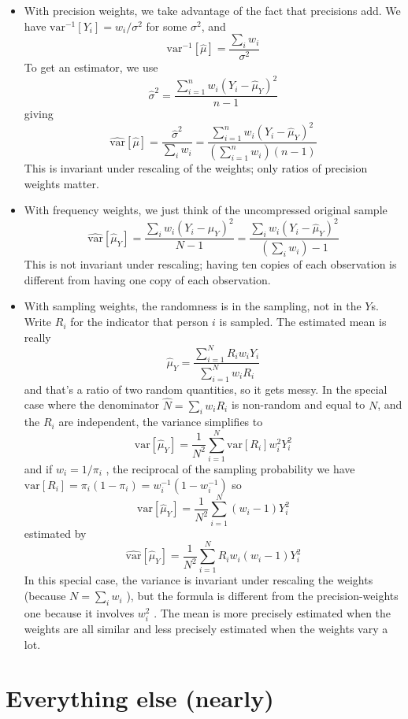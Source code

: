 \documentclass[fleqn,10pt]{latex/stylish_article} %
\providecommand{\tightlist}{%
  \setlength{\itemsep}{0pt}\setlength{\parskip}{0pt}}
\begin{document}
\begin{itemize}
\tightlist
\item
  With precision weights, we take advantage of the fact that precisions add. We have \(\mathrm{var}^{-1}[Y_i]= w_i/\sigma^2\) for some \(\sigma^2\), and
  \[
  \mathrm{var}^{-1}[\hat\mu] = \frac{\sum_i w_i}{\sigma^2}
  \]
  To get an estimator, we use
  \[
  \hat\sigma^2 =\frac{\sum_{i=1}^n w_i(Y_i-\hat\mu_Y)^2}{n-1}
  \]
  giving
  \[
  \widehat{\mathrm{var}}[\hat\mu] = \frac{\hat\sigma^2}{\sum_i w_i}= \frac{\sum_{i=1}^n w_i(Y_i-\hat\mu_Y)^2}{\left(\sum_{i=1}^n w_i\right)(n-1)}
  \]
  This is invariant under rescaling of the weights; only ratios of precision weights matter.\\
\item
  With frequency weights, we just think of the uncompressed original sample
  \[
  \widehat{\mathrm{var}}[\hat\mu_Y]= \frac{\sum_i w_i (Y_i-\hat\mu_Y)^2}{N-1}= \frac{\sum_i w_i (Y_i-\hat\mu_Y)^2}{(\sum_i w_i)-1}
  \]
  This is not invariant under rescaling; having ten copies of each observation is different from having one copy of each observation.
\item
  With sampling weights, the randomness is in the sampling, not in the
  \(Y\)s. Write \(R_i\) for the indicator that person \(i\) is sampled. The estimated mean is really
  \[
  \hat\mu_Y = \frac{\sum_{i=1}^NR_iw_iY_i}{\sum_{i=1}^N w_iR_i}
  \]
  and that's a ratio of two random quantities, so it gets messy. In the special case where the denominator
  \(\hat N=\sum_i w_iR_i\)
  is non-random and equal to \(N\), and the \(R_i\)
  are independent, the variance simplifies to
  \[
   \mathrm{var}[\hat \mu_Y] = \frac{1}{N^2}\sum_{i=1}^N \mathrm{var}[R_i]w_i^2Y_i^2
   \]
  and if
  \(w_i=1/\pi_i\)
  , the reciprocal of the sampling probability we have
  \(\mathrm{var}[R_i]=\pi_i(1-\pi_i)=w_i^{-1}(1-w_i^{-1})\)
  so
  \[
   \mathrm{var}[\hat \mu_Y] = \frac{1}{N^2}\sum_{i=1}^N (w_i-1){Y_i^2}
   \]
  estimated by
  \[
  \widehat{\mathrm{var}}[\hat \mu_Y] = \frac{1}{N^2}\sum_{i=1}^N R_iw_i(w_i-1){Y_i^2}
  \]
  In this special case, the variance is invariant under rescaling the weights (because
  \(N=\sum_i w_i\)
  ), but the formula is different from the precision-weights one because it involves
  \(w_i^2\)
  . The mean is more precisely estimated when the weights are all similar and less precisely estimated when the weights vary a lot.
\end{itemize}

\hypertarget{everything-else-nearly}{%
\section{Everything else (nearly)}\label{everything-else-nearly}}
\end{document}
